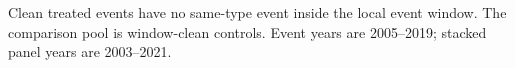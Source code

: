 \begin{center}
\scriptsize
{}
\vspace{0.05cm}
\parbox{0.94\textwidth}{\tiny Clean treated events have no same-type event inside the local event window. The comparison pool is window-clean controls. Event years are 2005--2019; stacked panel years are 2003--2021.}
\end{center}
